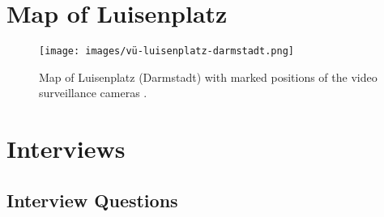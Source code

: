 \documentclass[12pt]{article}
\begin{document}
	\begin{appendices}
		\section{Map of Luisenplatz}
		\label{sec:luisenplatz-map}
		
		\begin{figure}[H]
			\centering
			\texttt{[image: images/vü-luisenplatz-darmstadt.png]} 
			\caption{Map of Luisenplatz (Darmstadt) with marked positions of the video surveillance cameras \parencite{magistratsbeschluss_luisenplatz_2020}.}
		\end{figure}
		
		\clearpage
		
		\section{Interviews}
		\label{app:interviews}
		
		\subsection{Interview Questions}
		

\end{appendices}
\end{document}
